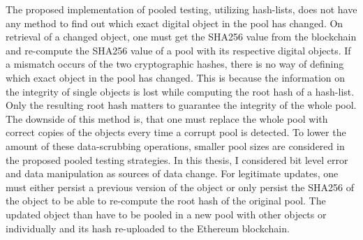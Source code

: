 \documentclass[final]{vutinfth}
\begin{document}
The proposed implementation of pooled testing, utilizing hash-lists, does not have any method to find out which exact digital object in the pool has changed. On retrieval of a changed object, one must get the SHA256 value from the blockchain and re-compute the SHA256 value of a pool with its respective digital objects. If a mismatch occurs of the two cryptographic hashes, there is no way of defining which exact object in the pool has changed. This is because the information on the integrity of single objects is lost while computing the root hash of a hash-list. Only the resulting root hash matters to guarantee the integrity of the whole pool. The downside of this method is, that one must replace the whole pool with correct copies of the objects every time a corrupt pool is detected. To lower the amount of these data-scrubbing operations, smaller pool sizes are considered in the proposed pooled testing strategies.
In this thesis, I considered bit level error and data manipulation as sources of data change. For legitimate updates, one must either persist a previous version of the object or only persist the SHA256 of the object to be able to re-compute the root hash of the original pool. The updated object than have to be pooled in a new pool with other objects or individually and its hash re-uploaded to the Ethereum blockchain.
\end{document}
